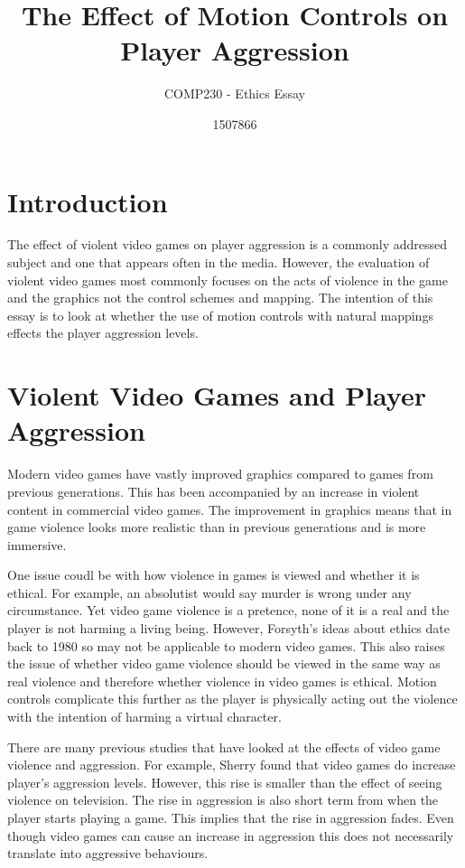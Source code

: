 \documentclass{scrartcl}
\title{The Effect of Motion Controls on Player Aggression }
\subtitle{COMP230 - Ethics Essay}
\author{1507866}
\begin{document}
	
\maketitle
	
	
\section{Introduction}
The effect of violent video games on player aggression is a commonly addressed subject and one that appears often in the media. 
However, the evaluation of violent video games most commonly focuses on the acts of violence in the game and the graphics not the control schemes and mapping.  The intention of this essay is to look at whether the use of motion controls with natural mappings effects the player aggression levels.

\section{Violent Video Games and Player Aggression}
 
Modern video games have vastly improved graphics compared to games from previous generations.  \cite{Fumhe}  This has been accompanied by an increase in violent content in commercial video games. \cite{Fumhe} The improvement in graphics means that in game violence looks more realistic than in previous generations and is more immersive. \cite{Kim}

\bigskip
One issue coudl be with how violence in games is viewed and whether it is ethical. For example, an absolutist would say murder is wrong under any circumstance. \cite{forsyth} 
Yet video game violence is a pretence, none of it is a real and the player is not harming a living being. \cite{Tavinor}
However, Forsyth's ideas about ethics date back to 1980 so may not be applicable to modern video games. 
This also raises the issue of whether video game violence should be viewed in the same way as real violence and therefore whether violence in video games is ethical. Motion controls complicate this further as the player is physically acting out the violence with the intention of harming a virtual character. 

\bigskip
There are many previous studies that have looked at the effects of video game violence and aggression. For example, Sherry found that video games do increase player's aggression levels. However, this rise is smaller than the effect of seeing violence on television.  \cite{sherry2001effects}
The rise in aggression is also short term from when the player starts playing a game. This implies that the rise in aggression fades. Even though video games can cause an increase in aggression this does not necessarily translate into aggressive behaviours.  \cite{Ferguson}  
\end{document}
